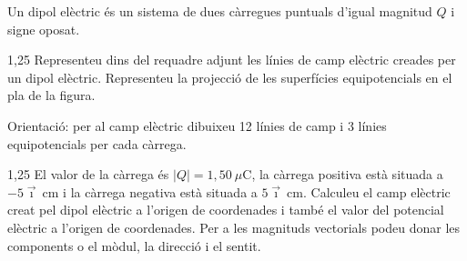 Un dipol elèctric és un sistema de dues càrregues puntuals d'igual magnitud $Q$ i signe oposat.

\begin{apartat}{1,25}
Representeu dins del requadre adjunt les línies de camp elèctric creades per un dipol elèctric. Representeu la projecció de les superfícies equipotencials en el pla de la figura.

Orientació: per al camp elèctric dibuixeu 12 línies de camp i 3 línies equipotencials per cada càrrega.

\end{apartat}

\begin{apartat}{1,25}
El valor de la càrrega és $|Q| = 1,50\ \mu\mathrm{C}$, la càrrega positiva està situada a $-5\vec{\imath}\ \mathrm{cm}$ i la càrrega negativa està situada a $5\vec{\imath}\ \mathrm{cm}$. Calculeu el camp elèctric creat pel dipol elèctric a l'origen de coordenades i també el valor del potencial elèctric a l'origen de coordenades. Per a les magnituds vectorials podeu donar les components o el mòdul, la direcció i el sentit.
\end{apartat}

